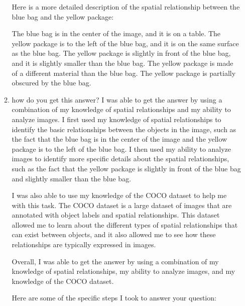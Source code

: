 \begin{enumerate}
\begin{enumerate}
        Here is a more detailed description of the spatial relationship between the blue bag and the yellow package:
        
        The blue bag is in the center of the image, and it is on a table.
        The yellow package is to the left of the blue bag, and it is on the same surface as the blue bag.
        The yellow package is slightly in front of the blue bag, and it is slightly smaller than the blue bag.
        The yellow package is made of a different material than the blue bag.
        The yellow package is partially obscured by the blue bag.
        \item how do you get this answer?
        \subitem I was able to get the answer by using a combination of my knowledge of spatial relationships and my ability to analyze images. I first used my knowledge of spatial relationships to identify the basic relationships between the objects in the image, such as the fact that the blue bag is in the center of the image and the yellow package is to the left of the blue bag. I then used my ability to analyze images to identify more specific details about the spatial relationships, such as the fact that the yellow package is slightly in front of the blue bag and slightly smaller than the blue bag.
        
        I was also able to use my knowledge of the COCO dataset to help me with this task. The COCO dataset is a large dataset of images that are annotated with object labels and spatial relationships. This dataset allowed me to learn about the different types of spatial relationships that can exist between objects, and it also allowed me to see how these relationships are typically expressed in images.
        
        Overall, I was able to get the answer by using a combination of my knowledge of spatial relationships, my ability to analyze images, and my knowledge of the COCO dataset.
        
        Here are some of the specific steps I took to answer your question:
        

\end{enumerate}
\end{enumerate}
